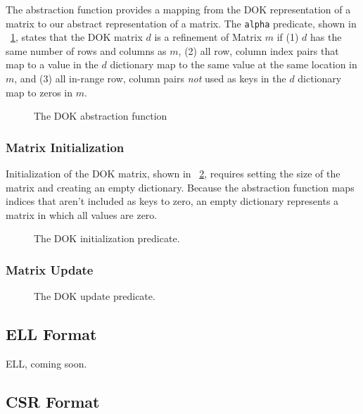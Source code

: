 \documentclass[11pt,conference]{IEEEtran}
\begin{document}
The abstraction function provides a mapping from the DOK representation of a matrix to our abstract representation of a matrix.  The \texttt{alpha} predicate, shown in \figurename~\ref{alpha:dok}, states that the DOK matrix $d$ is a refinement of Matrix $m$ if (1) $d$ has the same number of rows and columns as $m$, (2) all row, column index pairs that map to a value in the $d$ dictionary map to the same value at the same location in $m$, and (3) all in-range row, column pairs \emph{not} used as keys in the $d$ dictionary map to zeros in $m$.

\begin{figure}
\centering

\caption{The DOK abstraction function}
\label{alpha:dok}
\end{figure}

\subsubsection{Matrix Initialization}

Initialization of the DOK matrix, shown in \figurename~\ref{init:dok}, requires setting the size of the matrix and creating an empty dictionary.  Because the abstraction function maps indices that aren't included as keys to zero, an empty dictionary represents a matrix in which all values are zero.

\begin{figure}
\centering

\caption{The DOK initialization predicate.}
\label{init:dok}
\end{figure}

\subsubsection{Matrix Update}

\begin{figure}
\centering

\caption{The DOK update predicate.}
\label{update:dok}
\end{figure}

\subsection{ELL Format}

ELL, coming soon.

\subsection{CSR Format}
\end{document}
